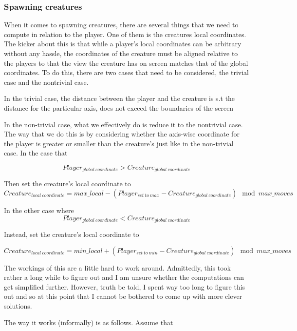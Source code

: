 \documentclass{article}
\begin{document}
\subsubsection{Spawning creatures}
When it comes to spawning creatures, there are several things that we need to compute in relation to the player. One of them is the creatures local coordinates. The kicker about this is that while a player's local coordinates can be arbitrary without any hassle, the coordinates of the creature must be aligned relative to the players to that the view the creature has on screen matches that of the global coordinates. To do this, there are two cases that need to be considered, the trivial case and the nontrivial case. \newline

In the trivial case, the distance between the player and the creature is s.t the distance for the particular axis, does not exceed the boundaries of the screen \newline

In the non-trivial case, what we effectively do is reduce it to the nontrivial case. The way that we do this is by considering whether the axis-wise coordinate for the player is greater or smaller than the creature's just like in the non-trivial case. In the case that

\[ Player_{global  \:coordinate} > Creature_{global \: coordinate} \]

Then set the creature's local coordinate to
\[ Creature_{local \: coordinate} = max\_local - (Player_{set \: to \: max} - Creature_{global \: coordinate} ) \mod  max\_moves  \]


In the other case where 
\[ Player_{global  \:coordinate} < Creature_{global \: coordinate} \]

Instead, set the creature's local coordinate to

\[ Creature_{local \: coordinate} = min\_local + (Player_{set \: to \: min} - Creature_{global \: coordinate} ) \mod  max\_moves  \]

The workings of this are a little hard to work around. Admittedly, this took rather a long while to figure out and I am unsure whether the computations can get simplified further. However, truth be told, I spent way too long to figure this out and so at this point that I cannot be bothered to come up with more clever solutions. \newline

The way it works (informally) is as follows. Assume that
\end{document}
